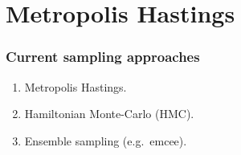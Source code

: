 \documentclass[%
]{beamer}
\begin{document}
\begin{frame}
\begin{columns}
\begin{column}{0.5\textwidth}
	\end{column}
	\end{columns}
 
\end{frame}


\section{Metropolis Hastings}

\begin{frame}
    \frametitle{Current sampling approaches}
    \begin{enumerate}
        \pause\item Metropolis Hastings.
        \pause\item Hamiltonian Monte-Carlo (HMC).
        \pause\item Ensemble sampling (e.g.\ emcee).
    \end{enumerate}
\end{frame}
\end{document}
